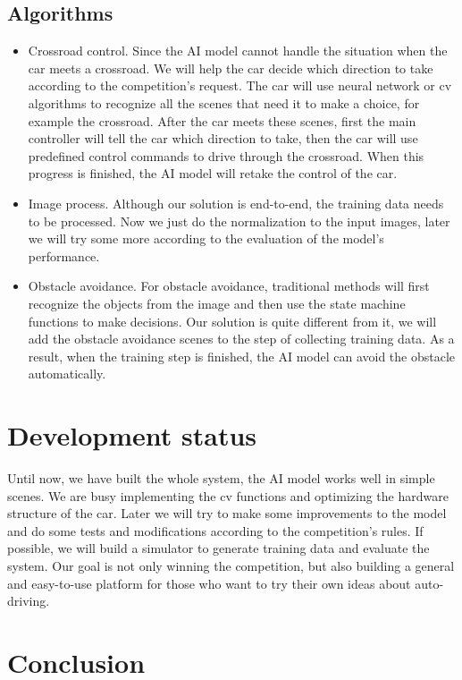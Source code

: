 \documentclass[conference]{IEEEtran}
\begin{document}
\subsection{Algorithms}
\begin{itemize}
\item Crossroad control. Since the AI model cannot handle the situation when the car meets a crossroad. We will help the car decide which direction to take according to the competition's request. The car will use neural network or cv algorithms to recognize all the scenes that need it to make a choice, for example the crossroad. After the car meets these scenes, first the main controller will tell the car which direction to take, then the car will use predefined control commands to drive through the crossroad. When this progress is finished, the AI model will retake the control of the car.
\item Image process. Although our solution is end-to-end, the training data needs to be processed. Now we just do the normalization to the input images, later we will try some more according to the evaluation of the model's performance.
\item Obstacle avoidance. For obstacle avoidance, traditional methods will first recognize the objects from the image and then use the state machine functions to make decisions. Our solution is quite different from it, we will add the obstacle avoidance scenes to the step of collecting training data. As a result, when the training step is finished, the AI model can avoid the obstacle automatically.
\end{itemize}

\section{Development status}

Until now, we have built the whole system, the AI model works well in simple scenes. We are busy implementing the cv functions and optimizing the hardware structure of the car. Later we will try to make some improvements to the model and do some tests and modifications according to the competition's rules. If possible, we will build a simulator to generate training data and evaluate the system. Our goal is not only winning the competition, but also building a general and easy-to-use platform for those who want to try their own ideas about auto-driving.

\section{Conclusion}
\end{document}
